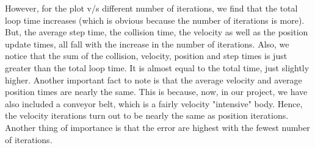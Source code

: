 \documentclass[a4paper,11pt]{article}
\begin{document}
	However, for the plot v/s different number of iterations, we find that the total loop time increases (which is obvious because the number of iterations is more). But, the average step time, the collision time, the velocity as well as the position update times, all fall with the increase in the number of iterations.
	Also, we notice that the sum of the collision, velocity, position and step times is just greater than the total loop time. It is almost equal to the total time, just slightly higher.
	Another important fact to note is that the average velocity and average position times are nearly the same. This is because, now, in our project, we have also included a conveyor belt, which is a fairly velocity "intensive" body. Hence, the velocity iterations turn out to be nearly the same as position iterations.
        Another thing of importance is that the error are highest with the fewest number of iterations.
\end{document}
